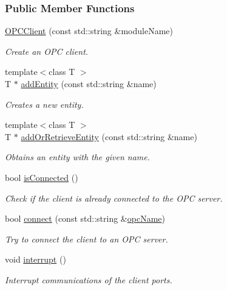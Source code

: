 \subsubsection*{Public Member Functions}
\begin{DoxyCompactItemize}
\item 
\hyperlink{group__icubclient__clients_a9c46e911dfd3ddb68f79d7601355329a}{O\+P\+C\+Client} (const std\+::string \&module\+Name)
\begin{DoxyCompactList}\small\item\em Create an O\+PC client. \end{DoxyCompactList}\item 
{\footnotesize template$<$class T $>$ }\\T $\ast$ \hyperlink{group__icubclient__clients_a8ce1aa9d81ed8d32e53346b94f3c032c}{add\+Entity} (const std\+::string \&name)
\begin{DoxyCompactList}\small\item\em Creates a new entity. \end{DoxyCompactList}\item 
{\footnotesize template$<$class T $>$ }\\T $\ast$ \hyperlink{group__icubclient__clients_a4874ae1177b1f4a7aa5267428de3a8b7}{add\+Or\+Retrieve\+Entity} (const std\+::string \&name)
\begin{DoxyCompactList}\small\item\em Obtains an entity with the given name. \end{DoxyCompactList}\item 
bool \hyperlink{group__icubclient__clients_aa4d162f66e8a7c1b3418e331fcc0556f}{is\+Connected} ()
\begin{DoxyCompactList}\small\item\em Check if the client is already connected to the O\+PC server. \end{DoxyCompactList}\item 
bool \hyperlink{group__icubclient__clients_ab5223fad505130bd95aba586889edefc}{connect} (const std\+::string \&\hyperlink{group__icubclient__clients_aaa18459f611f4c14b7e3a197d7ce9b7a}{opc\+Name})
\begin{DoxyCompactList}\small\item\em Try to connect the client to an O\+PC server. \end{DoxyCompactList}\item 
void \hyperlink{group__icubclient__clients_a319df571cac4fc425832546234cda426}{interrupt} ()
\begin{DoxyCompactList}\small\item\em Interrupt communications of the client ports. \end{DoxyCompactList}\item 

\end{DoxyCompactItemize}
